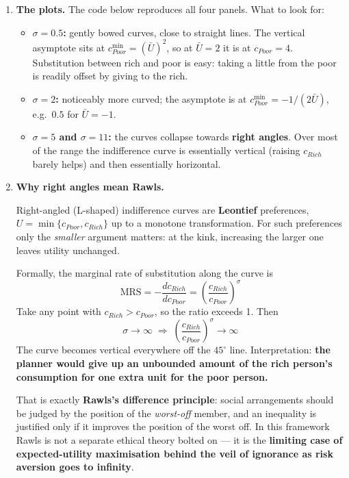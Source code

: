 \documentclass[12pt, letterpaper]{article}
\newcommand{\dd}[2]{\dfrac{d #1}{d #2}}
\newcommand{\MRS}{\mathrm{MRS}}
\begin{document}
\begin{tcolorbox}[evenbox,title={Problem 2.10 \quad Risk Aversion and the Difference Principle}]
\begin{enumerate}
\item \textbf{The plots.} The code below reproduces all four panels. What to look for:

\begin{itemize}[leftmargin=1.3em,itemsep=3pt,topsep=2pt]
\item \textbf{$\sigma = 0.5$:} gently bowed curves, close to straight lines. The vertical
asymptote sits at $c_{Poor}^{\min} = (\bar U)^2$, so at $\bar U = 2$ it is at
$c_{Poor} = 4$. Substitution between rich and poor is easy: taking a little from the
poor is readily offset by giving to the rich.
\item \textbf{$\sigma = 2$:} noticeably more curved; the asymptote is at
$c_{Poor}^{\min} = -1/(2\bar U)$, e.g.\ $0.5$ for $\bar U = -1$.
\item \textbf{$\sigma = 5$ and $\sigma = 11$:} the curves collapse towards \textbf{right
angles}. Over most of the range the indifference curve is essentially vertical (raising
$c_{Rich}$ barely helps) and then essentially horizontal.
\end{itemize}

\item \textbf{Why right angles mean Rawls.}

Right-angled (L-shaped) indifference curves are \textbf{Leontief} preferences,
$U = \min\{c_{Poor}, c_{Rich}\}$ up to a monotone transformation. For such preferences only
the \emph{smaller} argument matters: at the kink, increasing the larger one leaves utility
unchanged.

Formally, the marginal rate of substitution along the curve is
$$\MRS = -\dd{c_{Rich}}{c_{Poor}}
= \left(\frac{c_{Rich}}{c_{Poor}}\right)^{\sigma}$$
Take any point with $c_{Rich} > c_{Poor}$, so the ratio exceeds 1. Then
$$\sigma \to \infty \;\Longrightarrow\; \left(\frac{c_{Rich}}{c_{Poor}}\right)^{\sigma} \to \infty$$
The curve becomes vertical everywhere off the $45^\circ$ line. Interpretation: \textbf{the
planner would give up an unbounded amount of the rich person's consumption for one extra unit
for the poor person.}

That is exactly \textbf{Rawls's difference principle}: social arrangements should be judged
by the position of the \emph{worst-off} member, and an inequality is justified only if it
improves the position of the worst off. In this framework Rawls is not a separate ethical
theory bolted on --- it is the \textbf{limiting case of expected-utility maximisation behind
the veil of ignorance as risk aversion goes to infinity}.


\end{enumerate}
\end{tcolorbox}
\end{document}
